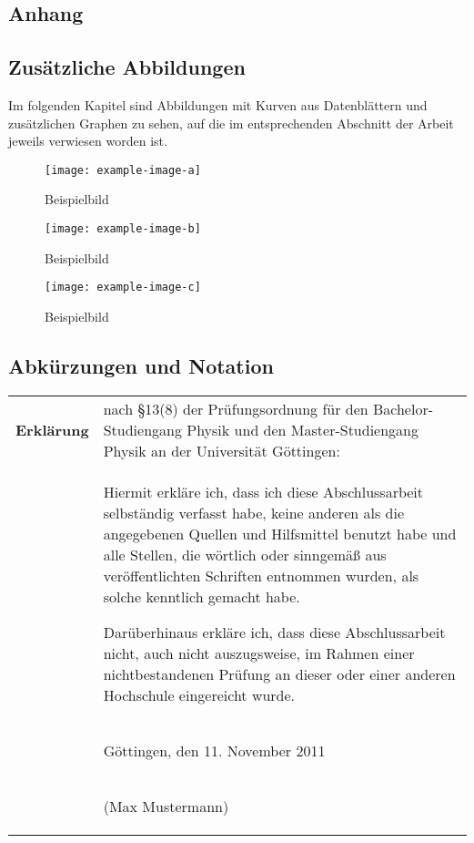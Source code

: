 
\begin{appendix}
\printbibliography
\chapter{Anhang}
 \section{Zusätzliche Abbildungen}
 Im folgenden Kapitel sind Abbildungen mit Kurven aus Datenblättern und
 zusätzlichen Graphen zu sehen, auf die im entsprechenden Abschnitt der Arbeit
 jeweils verwiesen worden ist.

\begin{figure}
  \texttt{[image: example-image-a]}
  \caption{Beispielbild}
\end{figure}

\begin{figure}
  \texttt{[image: example-image-b]}
  \caption{Beispielbild}
\end{figure}

\begin{figure}
  \texttt{[image: example-image-c]}
  \caption{Beispielbild}
\end{figure}

 \FloatBarrier
 \newpage
\section{Abkürzungen und Notation}
\printglossary[type=\acronymtype,title=Abkürzungen]
\printglossary[title=Notation]

\end{appendix}

  \cleardoublepage\thispagestyle{empty}
  \null\vfill
  \noindent
  \begin{tabular}[t]{p{}p{}}
    \bfseries\large Erkl\"arung&nach
    \S13(8)%
    der Prüfungsordnung für den
    Bachelor-Studiengang Physik und den Master-Studiengang Physik
    an der Universität Göttingen:\\[1em]
    &Hiermit erkläre ich, dass ich diese Abschlussarbeit
    selbständig verfasst habe, keine anderen als die
    angegebenen Quellen und Hilfsmittel benutzt habe und alle Stellen,
    die wörtlich oder sinngemä\ss{} aus veröffentlichten Schriften
    entnommen wurden, als solche kenntlich gemacht habe.

    Darüberhinaus erkläre ich, dass diese Abschlussarbeit nicht, auch nicht
    auszugsweise, im Rahmen einer nichtbestandenen Prüfung an dieser oder
    einer anderen Hochschule eingereicht wurde.\\[1em]
    &\begin{center}Göttingen, den 11. November 2011\end{center}\\[1.5cm]
    &\begin{center}(Max Mustermann)\end{center}
  \end{tabular}
  \vfill
